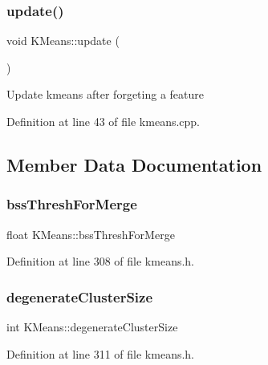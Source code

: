 \subsubsection{\texorpdfstring{update()}{update()}}
{\footnotesize\ttfamily void K\+Means\+::update (\begin{DoxyParamCaption}{ }\end{DoxyParamCaption})}

Update kmeans after forgeting a feature 

Definition at line 43 of file kmeans.\+cpp.



\subsection{Member Data Documentation}
\mbox{\label{class_k_means_af7004e76ea22f687b4066644a37bf8c9}} 
\subsubsection{\texorpdfstring{bss\+Thresh\+For\+Merge}{bssThreshForMerge}}
{\footnotesize\ttfamily float K\+Means\+::bss\+Thresh\+For\+Merge\hspace{0.3cm}{\ttfamily [protected]}}



Definition at line 308 of file kmeans.\+h.

\mbox{\label{class_k_means_a50600403065d0f967e8f2cfdcf6366e8}} 
\subsubsection{\texorpdfstring{degenerate\+Cluster\+Size}{degenerateClusterSize}}
{\footnotesize\ttfamily int K\+Means\+::degenerate\+Cluster\+Size\hspace{0.3cm}{\ttfamily [protected]}}



Definition at line 311 of file kmeans.\+h.

\mbox{\label{class_k_means_aa0fdafa4937a817dd15c182ce0c049fe}} 
